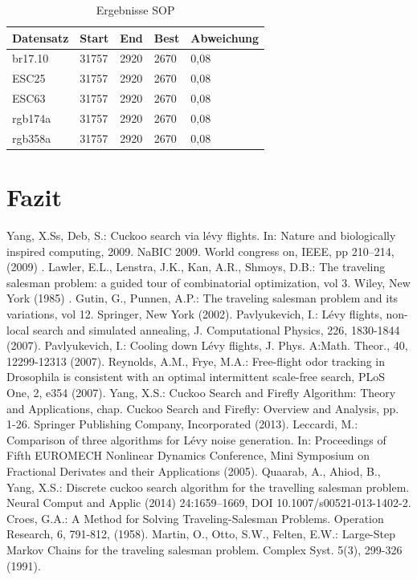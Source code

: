 \documentclass[conference]{IEEEtran}
\begin{document}
    \begin{table}[h]
      \label{SOP}
      \centering
      \begin{tabular}{|l|ll|l|l|}
      \hline
          Datensatz & \multicolumn{1}{l|}{Start} & End  & Best & Abweichung \\ \hline
          br17.10  & \multicolumn{1}{l|}{31757} & 2920 & 2670 & 0,08       \\ \hline
          ESC25  & \multicolumn{1}{l|}{31757} & 2920 & 2670 & 0,08       \\ \hline
          ESC63  & \multicolumn{1}{l|}{31757} & 2920 & 2670 & 0,08       \\ \hline
          rgb174a  & \multicolumn{1}{l|}{31757} & 2920 & 2670 & 0,08       \\ \hline
          rgb358a  & \multicolumn{1}{l|}{31757} & 2920 & 2670 & 0,08       \\ \hline
      \end{tabular}
      \caption[]{Ergebnisse SOP}
    \end{table}

  \section{Fazit}


  \begin{thebibliography}{00}
   Yang, X.Ss, Deb, S.: Cuckoo search via lévy flights. In: Nature and biologically inspired computing, 2009. NaBIC 2009. World congress on, IEEE, pp 210–214, (2009) .
   Lawler, E.L., Lenstra, J.K., Kan, A.R., Shmoys, D.B.: The traveling salesman problem: a guided tour of combinatorial optimization, vol 3. Wiley, New York (1985) .
   Gutin, G., Punnen, A.P.: The traveling salesman problem and its variations, vol 12. Springer, New York (2002).
   Pavlyukevich, I.: Lévy flights, non-local search and simulated annealing, J. Computational Physics, 226, 1830-1844 (2007).
   Pavlyukevich, I.: Cooling down Lévy flights, J. Phys. A:Math. Theor., 40, 12299-12313 (2007).
   Reynolds, A.M., Frye, M.A.: Free-flight odor tracking in Drosophila is consistent with an optimal intermittent scale-free search, PLoS One, 2, e354 (2007).
   Yang, X.S.: Cuckoo Search and Firefly Algorithm: Theory and Applications, chap. Cuckoo Search and Firefly: Overview and Analysis, pp. 1-26. Springer Publishing Company, Incorporated (2013).
   Leccardi, M.: Comparison of three algorithms for Lévy noise generation. In: Proceedings of Fifth EUROMECH Nonlinear Dynamics Conference, Mini Symposium on Fractional Derivates and their Applications (2005).
   Quaarab, A., Ahiod, B., Yang, X.S.: Discrete cuckoo search algorithm for the travelling salesman problem. Neural Comput and Applic (2014) 24:1659–1669, DOI 10.1007/s00521-013-1402-2.
   Croes, G.A.: A Method for Solving Traveling-Salesman Problems. Operation Research, 6, 791-812, (1958). 
   Martin, O., Otto, S.W., Felten, E.W.: Large-Step Markov Chains for the traveling salesman problem. Complex Syst. 5(3), 299-326 (1991).
      

  \end{thebibliography}
\end{document}
